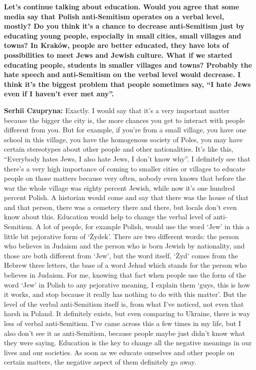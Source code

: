 \textbf{Let’s continue talking about education. Would you agree that some media say that Polish anti-Semitism operates on a verbal level, mostly? Do you think it’s a chance to decrease anti-Semitism just by educating young people, especially in small cities, small villages and towns? In Kraków, people are better educated, they have lots of possibilities to meet Jews and Jewish culture. What if we started educating people, students in smaller villages and towns? Probably the hate speech and anti-Semitism on the verbal level would decrease. I think it’s the biggest problem that people sometimes say, ``I hate Jews even if I haven’t ever met any''.} \par
\textbf{Serhii Czupryna:} Exactly. I would say that it’s a very important matter because the bigger the city is, the more chances you get to interact with people different from you. But for example, if you’re from a small village, you have one school in this village, you have the homogenous society of Poles, you may have certain stereotypes about other people and other nationalities. It’s like this, ``Everybody hates Jews, I also hate Jews, I don’t know why''. I definitely see that there’s a very high importance of coming to smaller cities or villages to educate people on those matters because very often, nobody even knows that before the war the whole village was eighty percent Jewish, while now it’s one hundred percent Polish. A historian would come and say that there was the house of that and that person, there was a cemetery there and there, but locals don’t even know about this. Education would help to change the verbal level of anti-Semitism. A lot of people, for example Polish, would use the word ‘Jew’ in this a little bit pejorative form of ‘Żydek’. There are two different words: the person who believes in Judaism and the person who is born Jewish by nationality, and those are both different from ‘Jew’, but the word itself, ‘Żyd’ comes from the Hebrew three letters, the base of a word Jehud which stands for the person who believes in Judaism. For me, knowing that fact when people use the form of the word ‘Jew’ in Polish to any pejorative meaning, I explain them ‘guys, this is how it works, and stop because it really has nothing to do with this matter’. But the level of the verbal anti-Semitism itself is, from what I’ve noticed, not even that harsh in Poland. It definitely exists, but even comparing to Ukraine, there is way less of verbal anti-Semitism. I’ve came across this a few times in my life, but I also don’t see it as anti-Semitism, because people maybe just didn’t know what they were saying. Education is the key to change all the negative meanings in our lives and our societies. As soon as we educate ourselves and other people on certain matters, the negative aspect of them definitely go away.\par 
